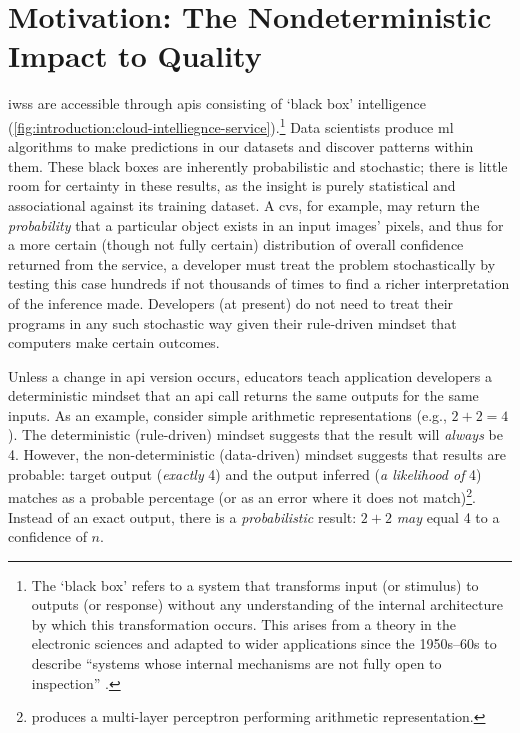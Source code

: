 
\section{Motivation: The Nondeterministic Impact to Quality}
\label{sec:introduction:motivation}

\glspl{iws} are accessible through \glspl{api} consisting of `black box' intelligence (\cref{fig:introduction:cloud-intelliegnce-service}).\footnote{The `black box' refers to a system that transforms input (or stimulus)  to outputs (or response) without any understanding of the internal architecture by which this transformation occurs. This arises from a theory in the electronic sciences and adapted to wider applications since the 1950s--60s \citep{Ashby:1957db,Bunge:1963jm} to describe ``systems whose internal mechanisms are not fully open to inspection'' \citep{Ashby:1957db}. }
Data scientists produce \gls{ml} algorithms to make predictions in our datasets and discover patterns within them. These black boxes are inherently probabilistic and stochastic; there is little room for certainty in these results, as the insight is purely statistical and associational \citep{Pearl:2018uv} against its training dataset. 
A \gls{cvs}, for example, may return the \textit{probability} that a particular object exists in an input images' pixels, and thus for a more certain (though not fully certain) distribution of overall confidence returned from the service, a developer must treat the problem stochastically by testing this case hundreds if not thousands of times to find a richer interpretation of the inference made. 
Developers (at present) do not need to treat their programs in any such stochastic way given their rule-driven mindset that computers make certain outcomes.

Unless a change in \gls{api} version occurs, educators teach application developers a deterministic mindset that an \gls{api} call returns the same outputs for the same inputs. As an example, consider simple arithmetic representations (e.g., $2+2=4$). The deterministic (rule-driven) mindset suggests that the result will \textit{always} be 4. However, the non-deterministic (data-driven) mindset suggests that results are probable: target output (\textit{exactly} 4) and the output inferred (\textit{a likelihood of} 4) matches as a probable percentage (or as an error where it does not match)\footnote{\citet{Blake:1998vd} produces a multi-layer perceptron  performing arithmetic representation.}. Instead of an exact output, there is a \textit{probabilistic} result: $2+2$ \textit{may} equal 4 to a confidence of $n$. 

